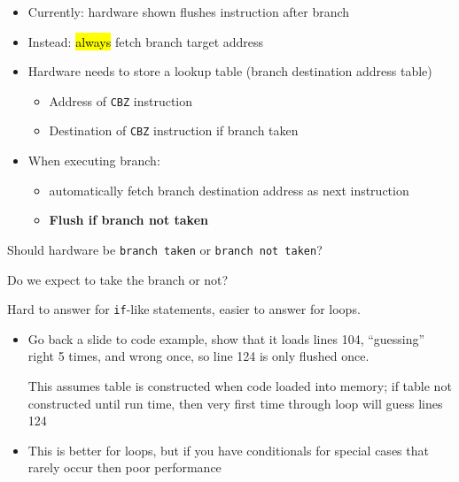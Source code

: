 \begin{frame}[fragile]
  \begin{itemize}
  \item Currently: hardware shown flushes instruction after branch

  \item Instead: \hl{always} fetch branch target address

    
  \item Hardware needs to store a lookup table (branch destination address table)
    \begin{itemize}
    \item Address of {\tt CBZ} instruction
    \item Destination of {\tt CBZ} instruction if branch taken
    \end{itemize}
  \item When executing branch:
  \begin{itemize}
      \item automatically fetch branch destination address as next instruction
\item   \textbf{Flush if branch not taken}
  \end{itemize}
 \end{itemize}
  \begin{tcolorbox}[enhanced,attach boxed title to top center={yshift=-3mm,yshifttext=-1mm},
  colback=blue!5!white,colframe=blue!75!black,colbacktitle=blue!80!black,
  title=Think About It,fonttitle=\bfseries,
  boxed title style={size=small,colframe=red!50!black} ]
 Should hardware be {\tt branch taken} or {\tt branch not taken}?
 
  Do we expect to take the branch or not?
  
  {\color{red}Hard to answer for \texttt{if}-like statements, easier to answer for loops.}
\end{tcolorbox}

\BNotes\ifnum{}
\begin{itemize}
\item Go back a slide to code example, show that it loads lines 104, ``guessing'' right 5 times, and wrong once, so line 124 is only flushed once.

  This assumes table is constructed when code loaded into memory; if table not constructed until run time, then very first time through loop will guess lines 124
  \item This is better for loops, but if you have conditionals for special
  cases that rarely occur then poor performance
\end{itemize}
\fi\ENotes
\end{frame}


